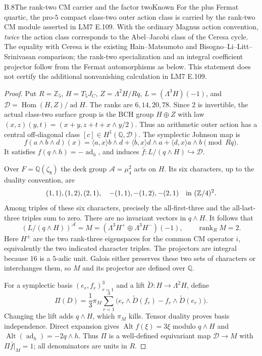 \begin{statement}{B.8}{The rank-two CM carrier and the factor two}{Known}
For the plus Fermat quartic, the pro-$5$ compact class-two outer
action class is carried by the rank-two CM module asserted in LM7
E.109. With the ordinary Magnus action convention, \emph{twice} the
action class corresponds to the Abel--Jacobi class of the Ceresa cycle.
The equality with Ceresa is the existing Hain--Matsumoto and
Bisogno--Li--Litt--Srinivasan comparison; the rank-two specialization
and an integral coefficient projector follow from the Fermat
automorphisms as below. This statement does not certify the additional
nonvanishing calculation in LM7 E.109.
\end{statement}
\begin{proof}
Put $R=\mathbb Z_5$, $H=T_5J_C$, $Z=\Lambda^2H/Rq$,
$L=(\Lambda^3H)(-1)$, and
$\mathcal D=\operatorname{Hom}(H,Z)/\operatorname{ad}H$.
The ranks are $6,14,20,78$. Since $2$ is invertible, the actual
class-two surface group is the BCH group $H\oplus Z$ with law
$(x,z)(y,t)=(x+y,z+t+x\wedge y/2)$. Thus an arithmetic outer action
has a central off-diagonal class $[c]\in H^1(\mathbb Q,\mathcal D)$.
The symplectic Johnson map is
\[
 f(a\wedge b\wedge d)(x)=
 \langle a,x\rangle b\wedge d+
 \langle b,x\rangle d\wedge a+
 \langle d,x\rangle a\wedge b\pmod{Rq}.
\]
It satisfies $f(q\wedge h)=-\operatorname{ad}_h$, and induces
$\bar f:L/(q\wedge H)\hookrightarrow\mathcal D$.

Over $F=\mathbb Q(\zeta_8)$ the deck group
$\mathcal A=\mu_4^2$ acts on $H$. Its six characters, up to the
duality convention, are
\[
 (1,1),(1,2),(2,1),\quad -(1,1),-(1,2),-(2,1)
       \quad\hbox{in }(\mathbb Z/4)^2.
\]
Among triples of these six characters, precisely the all-first-three
and the all-last-three triples sum to zero. There are no invariant
vectors in $q\wedge H$. It follows that
\[
 (L/(q\wedge H))^{\mathcal A}
   = M=(\Lambda^3H^+\oplus\Lambda^3H^-)(-1),
       \qquad \operatorname{rank}_R M=2.
\]
Here $H^\pm$ are the two rank-three eigenspaces for the common CM
operator $i$, equivalently the two indicated character triples.
The projectors are integral because $16$ is a $5$-adic unit.
Galois either preserves these two sets of characters or interchanges
them, so $M$ and its projector are defined over $\mathbb Q$.

For a symplectic basis $(e_r,f_r)_{r=1}^3$ and a lift
$\widetilde D:H\to\Lambda^2H$, define
\[
 \Pi(D)=\frac13\pi_M\sum_{r=1}^3
       \bigl(e_r\wedge\widetilde D(f_r)
                         -f_r\wedge\widetilde D(e_r)\bigr).
\]
Changing the lift adds $q\wedge H$, which $\pi_M$ kills.
Tensor duality proves basis independence. Direct expansion gives
$\operatorname{Alt}f(\xi)=3\xi$ modulo $q\wedge H$ and
$\operatorname{Alt}(\operatorname{ad}_h)=-2q\wedge h$.
Thus $\Pi$ is a well-defined equivariant map
$\mathcal D\to M$ with $\Pi\bar f|_M=1$; all denominators are
units in $R$.


\end{proof}
